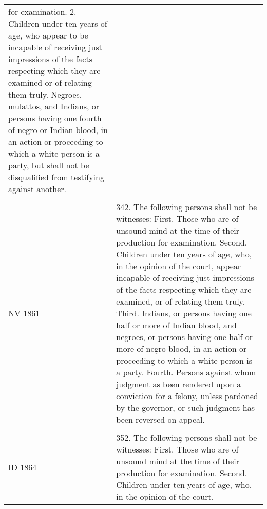 \documentclass[12pt,]{article}
\begin{document}
\begin{longtable}[]{@{}ll@{}}
\begin{minipage}[t]{0.77\columnwidth}
for examination. 2. Children under ten years of age, who appear to be
incapable of receiving just impressions of the facts respecting which
they are examined or of relating them truly. Negroes, mulattos, and
Indians, or persons having one fourth of negro or Indian blood, in an
action or proceeding to which a white person is a party, but shall not
be disqualified from testifying against another.\strut
\end{minipage}\tabularnewline
\begin{minipage}[t]{0.17\columnwidth}\raggedright
\strut
\end{minipage} & \begin{minipage}[t]{0.77\columnwidth}\raggedright
\strut
\end{minipage}\tabularnewline
\begin{minipage}[t]{0.17\columnwidth}\raggedright
NV 1861\strut
\end{minipage} & \begin{minipage}[t]{0.77\columnwidth}\raggedright
342. The following persons shall not be witnesses: First. Those who are
of unsound mind at the time of their production for examination. Second.
Children under ten years of age, who, in the opinion of the court,
appear incapable of receiving just impressions of the facts respecting
which they are examined, or of relating them truly. Third. Indians, or
persons having one half or more of Indian blood, and negroes, or persons
having one half or more of negro blood, in an action or proceeding to
which a white person is a party. Fourth. Persons against whom judgment
as been rendered upon a conviction for a felony, unless pardoned by the
governor, or such judgment has been reversed on appeal.\strut
\end{minipage}\tabularnewline
\begin{minipage}[t]{0.17\columnwidth}\raggedright
\strut
\end{minipage} & \begin{minipage}[t]{0.77\columnwidth}\raggedright
\strut
\end{minipage}\tabularnewline
\begin{minipage}[t]{0.17\columnwidth}\raggedright
ID 1864\strut
\end{minipage} & \begin{minipage}[t]{0.77\columnwidth}\raggedright
352. The following persons shall not be witnesses: First. Those who are
of unsound mind at the time of their production for examination. Second.
Children under ten years of age, who, in the opinion of the court,

\end{minipage}
\end{longtable}
\end{document}
